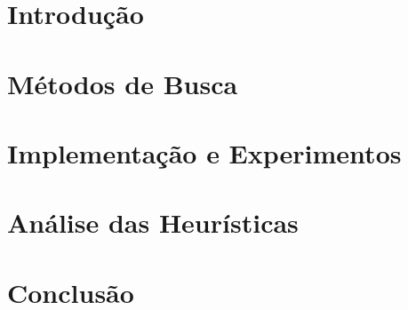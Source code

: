 \documentclass[a4paper,12pt,openany,twoside]{book}
\begin{document}
\singlespacing
{}



\listoffigures
\newpage

\tableofcontents
\newpage

\clearpage
{}
\onehalfspacing      %
\justifying          %

\chapter{Introdução}\label{cap:introducao}  
  
  
\chapter{Métodos de Busca}\label{cap:metodos}  
  
  
\chapter{Implementação e Experimentos}\label{cap:implementacao}  
 

\chapter{Análise das Heurísticas}\label{cap:analise-heuristicas}  
  
  
\chapter{Conclusão}\label{cap:conclusao}  
  

\clearpage



% 

\printindex
\end{document}
